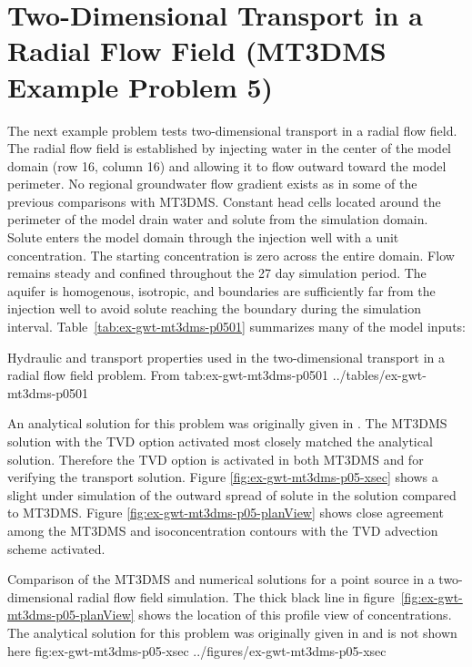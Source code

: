 \section{Two-Dimensional Transport in a Radial Flow Field (MT3DMS Example Problem 5)}

The next example problem tests two-dimensional transport in a radial flow field.  The radial flow field is established by injecting water in the center of the model domain (row 16, column 16) and allowing it to flow outward toward the model perimeter. No regional groundwater flow gradient exists as in some of the previous comparisons with MT3DMS. Constant head cells located around the perimeter of the model drain water and solute from the simulation domain. Solute enters the model domain through the injection well with a unit concentration.  The starting concentration is zero across the entire domain. Flow remains steady and confined throughout the 27 day simulation period. The aquifer is homogenous, isotropic, and boundaries are sufficiently far from the injection well to avoid solute reaching the boundary during the simulation interval. Table~\ref{tab:ex-gwt-mt3dms-p0501} summarizes many of the model inputs:

\begin{StandardTable}
	{Hydraulic and transport properties used in the two-dimensional transport in a radial flow field problem.  From \cite{zheng1999mt3dms}}
	{tab:ex-gwt-mt3dms-p0501}
	{../tables/ex-gwt-mt3dms-p0501}
\end{StandardTable}

An analytical solution for this problem was originally given in \cite{moench1981}. The MT3DMS solution with the TVD option activated most closely matched the analytical solution.  Therefore the TVD option is activated in both MT3DMS and \mf for verifying the transport solution. Figure \ref{fig:ex-gwt-mt3dms-p05-xsec} shows a slight under simulation of the outward spread of solute in the \mf solution compared to MT3DMS. Figure \ref{fig:ex-gwt-mt3dms-p05-planView} shows close agreement among the MT3DMS and \mf isoconcentration contours with the TVD advection scheme activated. 

\begin{StandardFigure}
	{Comparison of the MT3DMS and \mf numerical solutions for a point source in a two-dimensional radial flow field simulation.  The thick black line in figure~\ref{fig:ex-gwt-mt3dms-p05-planView} shows the location of this profile view of concentrations.  The analytical solution for this problem was originally given in \citep{moench1981} and is not shown here} 
	{fig:ex-gwt-mt3dms-p05-xsec}
	{../figures/ex-gwt-mt3dms-p05-xsec}
\end{StandardFigure}

